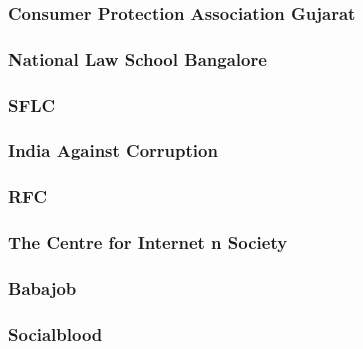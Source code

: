 \documentclass{article}
\begin{document}
\subsubsection{Consumer Protection Association Gujarat}


\subsubsection{National Law School Bangalore}


\subsubsection{SFLC}


\subsubsection{India Against Corruption}


\subsubsection{RFC}


\subsubsection{The Centre for Internet n Society}


\subsubsection{Babajob}


\subsubsection{Socialblood}


% 
\end{document}
